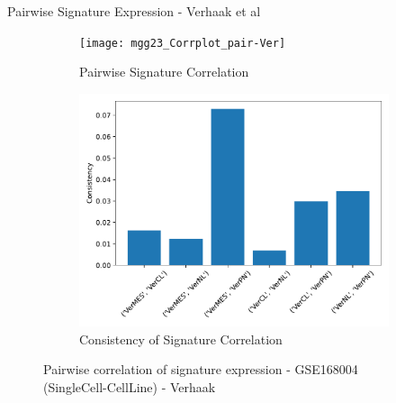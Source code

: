 \documentclass[aspectratio=169,9pt]{beamer}
\begin{document}
    \begin{frame}{Pairwise Signature Expression - Verhaak et al}
        \begin{adjustwidth}{-5cm}{-5cm}
            \centering
            \begin{figure}\ContinuedFloat
                \centering
                \begin{subfigure}[c]{0.7\textwidth}
                    \centering
                    \texttt{[image: mgg23\_Corrplot\_pair-Ver]}
                    \caption{Pairwise Signature Correlation}
                \end{subfigure}
                \begin{subfigure}[c]{0.4\textwidth}
                    \centering
                    \includegraphics[width=\textwidth]{mgg23_Consistency_Ver}
                    \caption{Consistency of Signature Correlation}
                \end{subfigure}
                \caption{Pairwise correlation of signature expression - GSE168004 (SingleCell-CellLine) - Verhaak}
            \end{figure}
        \end{adjustwidth}
    \end{frame}
\end{document}
